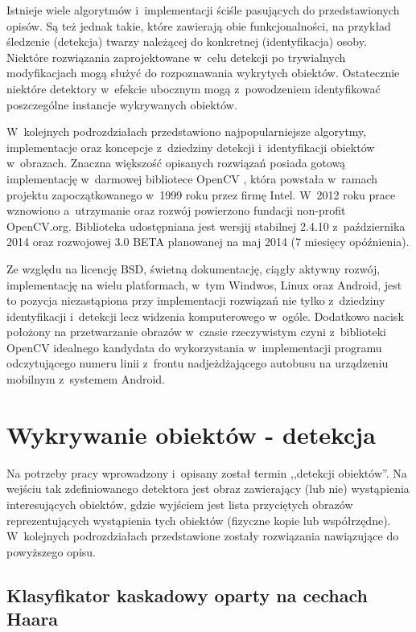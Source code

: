 Istnieje wiele algorytmów i~implementacji ściśle pasujących do
przedstawionych opisów. Są też jednak takie, które zawierają obie
funkcjonalności, na przykład śledzenie (detekcja) twarzy należącej
do konkretnej (identyfikacja) osoby. Niektóre rozwiązania zaprojektowane
w~celu detekcji po trywialnych modyfikacjach mogą służyć
do rozpoznawania wykrytych obiektów. Ostatecznie niektóre detektory
w~efekcie ubocznym mogą z~powodzeniem identyfikować poszczególne
instancje wykrywanych obiektów.

W~kolejnych podrozdziałach
przedstawiono najpopularniejsze algorytmy, implementacje
oraz koncepcje z~dziedziny detekcji i~identyfikacji obiektów w~obrazach.
Znaczna większość opisanych rozwiązań posiada gotową implementację
w~darmowej bibliotece OpenCV \cite{wiki:opencv}, która powstała
w~ramach projektu
zapoczątkowanego
w~1999 roku przez firmę Intel. W~2012 roku prace wznowiono
a~utrzymanie oraz rozwój powierzono fundacji non-profit
OpenCV.org. Biblioteka udostępniana jest wersjij
stabilnej 2.4.10 z~października 2014 oraz rozwojowej
3.0 BETA planowanej na maj 2014 (7 miesięcy opóźnienia).

Ze względu na licencję BSD, świetną
dokumentację, ciągły aktywny rozwój, implementację na wielu platformach,
w~tym Windwos, Linux oraz Android, jest to pozycja niezastąpiona
przy implementacji rozwiązań nie tylko z~dziedziny identyfikacji
i~detekcji lecz widzenia komputerowego w~ogóle. Dodatkowo nacisk
położony na przetwarzanie obrazów w~czasie rzeczywistym czyni z~biblioteki
OpenCV idealnego kandydata do wykorzystania w~implementacji
programu odczytującego numeru linii z~frontu nadjeżdżającego
autobusu na urządzeniu mobilnym z~systemem Android.

\section{Wykrywanie obiektów - detekcja}

Na potrzeby pracy wprowadzony i~opisany został termin
,,detekcji obiektów''. Na wejściu tak zdefiniowanego detektora
jest obraz zawierający (lub nie) wystąpienia interesujących obiektów, gdzie
wyjściem jest lista przyciętych obrazów reprezentujących wystąpienia tych
obiektów (fizyczne kopie lub współrzędne). W~kolejnych podrozdziałach
przedstawione zostały rozwiązania nawiązujące do powyższego opisu.

\subsection{Klasyfikator kaskadowy oparty na cechach Haara}

